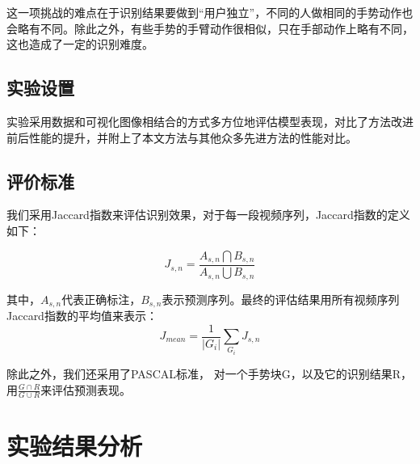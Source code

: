 \documentclass[a4paper, 12pt]{article}
\begin{document}
这一项挑战的难点在于识别结果要做到“用户独立”，不同的人做相同的手势动作也会略有不同。除此之外，有些手势的手臂动作很相似，只在手部动作上略有不同，这也造成了一定的识别难度。

\subsection{实验设置}
实验采用数据和可视化图像相结合的方式多方位地评估模型表现，对比了方法改进前后性能的提升，并附上了本文方法与其他众多先进方法的性能对比。


\subsection{评价标准}
我们采用Jaccard指数来评估识别效果，对于每一段视频序列，Jaccard指数的定义如下：

\begin{equation}
J_{s,n} = \frac{A_{s,n} \bigcap B_{s,n}}{A_{s,n} \bigcup B_{s,n}}
\end{equation}

其中，$A_{s,n}$代表正确标注，$B_{s,n}$表示预测序列。最终的评估结果用所有视频序列Jaccard指数的平均值来表示：
\begin{equation}
J_{mean} = \frac{1}{|G_i|}\sum_{G_i}J_{s,n}
\end{equation}


除此之外，我们还采用了PASCAL标准，
对一个手势块G，以及它的识别结果R，用$\frac{G\cap R}{G\cup R}$来评估预测表现。



\section{实验结果分析}
\end{document}
